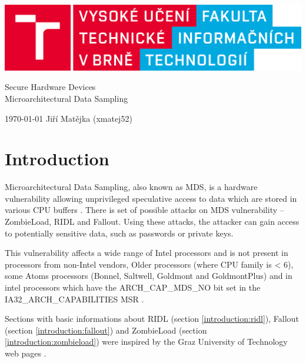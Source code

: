 \documentclass[11pt,a4paper,titlepage]{article}
\begin{document}
		\begin{center}

			\includegraphics[width = 150mm]{logo.png}\\


			\LARGE
			Secure Hardware Devices\\
			Microarchitectural Data Sampling\\

		\end{center}

	\Large{\today} \hfill Jiří Matějka (xmatej52)
	\thispagestyle{empty}
	\newpage
	\setcounter{page}{1}

    \tableofcontents
	\newpage
	\newpage

    \section{Introduction}
        Microarchitectural Data Sampling, also known as MDS, is a hardware vulnerability allowing unprivileged speculative access to data which are stored in various CPU buffers \cite{web:kernel}. There is set of possible attacks on MDS vulnerability -- ZombieLoad, RIDL and Fallout. Using these attacks, the attacker can gain access to potentially sensitive data, such as passwords or private keys.
        
        This vulnerability affects a wide range of Intel processors and is not present in processors from non-Intel vendors, Older processors (where CPU family is < 6), some Atoms processors (Bonnel, Saltwell, Goldmont and GoldmontPlus) and in intel processors which have the ARCH\_CAP\_MDS\_NO bit set in the IA32\_ARCH\_CAPABILITIES MSR \cite{web:kernel}.
            
        Sections with basic informations about RIDL (section \ref{introduction:ridl}), Fallout (section \ref{introduction:fallout}) and ZombieLoad (section \ref{introduction:zombieload}) were inspired by the Graz University of Technology web pages \cite{web:cpufail, web:zombieloadattack, web:ridl+fallout}.
    
\end{document}
